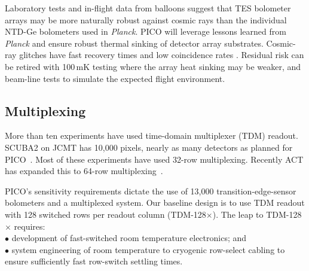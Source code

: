 
Laboratory tests and in-flight data from balloons suggest that TES
bolometer arrays may be more naturally robust against cosmic rays than
the individual NTD-Ge bolometers used in \textit{Planck}. PICO will leverage lessons
learned from \textit{Planck} and ensure robust thermal sinking of
detector array substrates. Cosmic-ray
glitches have fast recovery times and low coincidence rates
\citep{SPIDER2018,Filippini_inprep}. Residual risk can be retired with 100\,mK
testing where the array heat sinking may be weaker, and beam-line
tests to simulate the expected flight environment.

\subsection{Multiplexing}
\label{sec:multiplexing}

More than ten experiments have used time-domain multiplexer (TDM) readout. SCUBA2 on JCMT has 10,000 pixels, nearly as many detectors as planned for PICO~\citep{Holland2013}. Most of these experiments have used 32-row multiplexing. Recently ACT has expanded this to 64-row multiplexing~\citep{Henderson2016}.

PICO's sensitivity requirements dictate the use of 13,000 transition-edge-sensor bolometers and a multiplexed system.  Our baseline design is to use TDM readout with 128 switched rows per readout column (TDM-128$\times$). The leap to TDM-128$\times$ requires: \\
$\bullet$ development of fast-switched room temperature electronics; and \\
$\bullet$ system engineering of room temperature to cryogenic row-select cabling to ensure sufficiently fast row-switch settling times.

